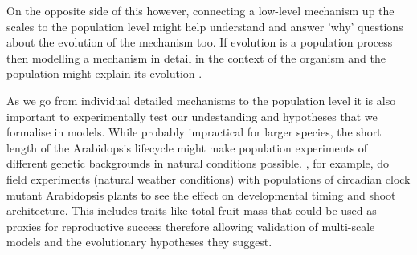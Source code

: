 \documentclass[phd]{infthesis}
\begin{document}
On the opposite side of this however, connecting a low-level mechanism up the
scales to the population level might help understand and answer 'why' questions
about the evolution of the mechanism too. If evolution is a population process
\citep{doebeli_towards_2017} then modelling a mechanism in detail in the context
of the organism and the population might explain its evolution
\citep[\enquote{Nothing in biology makes sense except in light of population
  genetics}][]{lynch_origins_2007}.

As we go from individual detailed mechanisms to the population level it is also
important to experimentally test our undestanding and hypotheses that we
formalise in models. While probably impractical for larger species, the short
length of the Arabidopsis lifecycle might make population experiments of
different genetic backgrounds in natural conditions
possible. \citep{rubin_circadian_2018}, for example, do field experiments
(natural weather conditions) with populations of circadian clock mutant
Arabidopsis plants to see the effect on developmental timing and shoot
architecture. This includes traits like total fruit mass that could be used as
proxies for reproductive success therefore allowing validation of multi-scale
models and the evolutionary hypotheses they suggest.












\printbibliography[heading=bibintoc]
\end{document}
